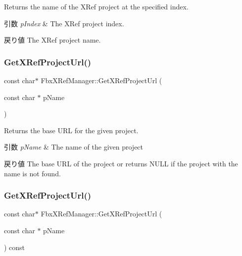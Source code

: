 Returns the name of the X\+Ref project at the specified index. 
\begin{DoxyParams}{引数}
{\em p\+Index} & The X\+Ref project index. \\
\hline
\end{DoxyParams}
\begin{DoxyReturn}{戻り値}
The X\+Ref project name. 
\end{DoxyReturn}
\mbox{\label{class_fbx_x_ref_manager_a43c9f593d33d7c8a4275b597d32ecfb7}} 
\subsubsection{\texorpdfstring{Get\+X\+Ref\+Project\+Url()}{GetXRefProjectUrl()}\hspace{0.1cm}{\footnotesize\ttfamily [1/3]}}
{\footnotesize\ttfamily const char$\ast$ Fbx\+X\+Ref\+Manager\+::\+Get\+X\+Ref\+Project\+Url (\begin{DoxyParamCaption}\item[{const char $\ast$}]{p\+Name }\end{DoxyParamCaption})}

Returns the base U\+RL for the given project. 
\begin{DoxyParams}{引数}
{\em p\+Name} & The name of the given project \\
\hline
\end{DoxyParams}
\begin{DoxyReturn}{戻り値}
The base U\+RL of the project or returns N\+U\+LL if the project with the name is not found. 
\end{DoxyReturn}
\mbox{\label{class_fbx_x_ref_manager_a77d5c777e93f8b03938c07c7ea115dc2}} 
\subsubsection{\texorpdfstring{Get\+X\+Ref\+Project\+Url()}{GetXRefProjectUrl()}\hspace{0.1cm}{\footnotesize\ttfamily [2/3]}}
{\footnotesize\ttfamily const char$\ast$ Fbx\+X\+Ref\+Manager\+::\+Get\+X\+Ref\+Project\+Url (\begin{DoxyParamCaption}\item[{const char $\ast$}]{p\+Name }\end{DoxyParamCaption}) const}

